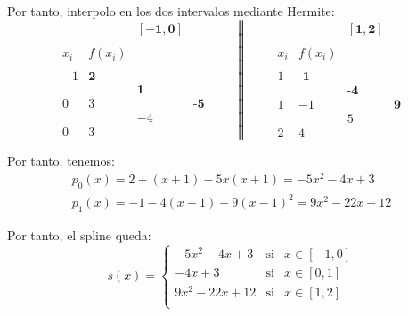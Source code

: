 \begin{ejercicio}
\begin{enumerate}
        Por tanto, interpolo en los dos intervalos mediante Hermite:
        \begin{equation*}
            \begin{array}{c|ccc}
                &&\mathbf{[-1, 0]} \\ \\
                x_i & f(x_i) \\ \\
                -1 & \textbf{2} \\
                && \textbf{1} \\ 
                0 & 3 && \textbf{-5}\\
                && -4\\
                0 & 3
            \end{array}
            \qquad \left\|\qquad \begin{array}{c|ccc}
                &&\mathbf{[1,2]} \\ \\
                x_i & f(x_i) \\ \\
                1 & \textbf{-1} \\
                && \textbf{-4} \\ 
                1 & -1 && \textbf{9}\\
                && 5\\
                2 & 4
            \end{array}\right.
        \end{equation*}

        Por tanto, tenemos:
        \begin{gather*}
            p_0(x)=2+(x+1)-5x(x+1)=-5x^2-4x+3
            \\
            p_1(x)=-1-4(x-1)+9(x-1)^2 = 9x^2-22x+12
        \end{gather*}

        Por tanto, el spline queda:
        \begin{equation*}
            s(x)=\left\{\begin{array}{lll}
                -5x^2-4x+3 & \text{si} & x\in [-1, 0]\\
                -4x+3 & \text{si} & x\in [0,1]\\
                9x^2-22x+12 & \text{si} & x\in [1,2]\\
            \end{array} \right.
        \end{equation*}
        


\end{enumerate}
\end{ejercicio}
